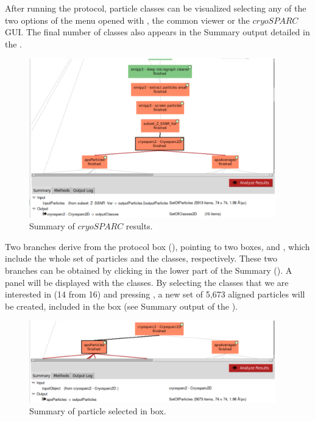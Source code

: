 After running the protocol, particle classes can be visualized selecting any of the two options of the menu opened with , the common \scipion viewer or the $cryoSPARC$ GUI. The final number of classes also appears in the Summary output detailed in the .

\begin{figure}[H]
  \centering
  \captionsetup{width=.8\linewidth} 
  \includegraphics[width=0.95\textwidth]
  {images/cryosparc2_B.pdf}
  \caption{Summary of $cryoSPARC$  results.}
  \label{fig:cryosparc2_2branches}
  \end{figure}
  
Two branches derive from the  protocol box (), pointing to two boxes,  and , which include the whole set of particles and the  classes, respectively. These two branches can be obtained by clicking in the lower part of the Summary (). A panel will be displayed with the  classes. By selecting the classes that we are interested in (14 from 16) and pressing , a new set of 5,673 aligned particles will be created, included in the box  (see Summary output of the ). 

\begin{figure}[H]
  \centering
  \captionsetup{width=.8\linewidth} 
  \includegraphics[width=0.95\textwidth]
  {images/cryosparc2_C.pdf}
  \caption{Summary of particle selected in  box.}
  \label{fig:cryosparc2_apoParticles}
  \end{figure}


